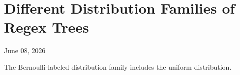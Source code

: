 \chapter{Different Distribution Families of Regex Trees}
\begin{center}
  June 08, 2026
  \vspace{0.5cm}
\end{center}

The Bernoulli-labeled distribution family includes the uniform distribution.